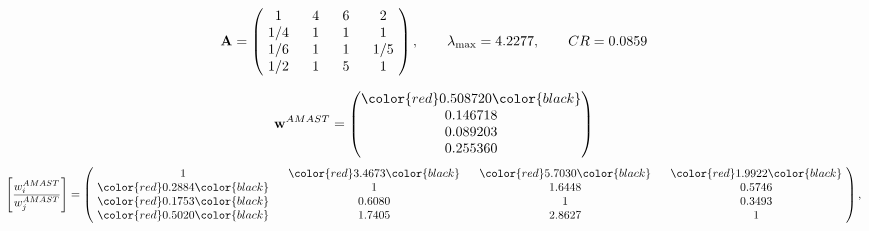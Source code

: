 \begin{example}
\begin{equation*}
\mathbf{A} =
\begin{pmatrix}
$\,\,$ 1 $\,\,$ & $\,\,$4$\,\,$ & $\,\,$6$\,\,$ & $\,\,$2 $\,\,$ \\
$\,\,$ 1/4$\,\,$ & $\,\,$ 1 $\,\,$ & $\,\,$1$\,\,$ & $\,\,$1 $\,\,$ \\
$\,\,$ 1/6$\,\,$ & $\,\,$ 1 $\,\,$ & $\,\,$ 1 $\,\,$ & $\,\,$ 1/5 $\,\,$ \\
$\,\,$ 1/2$\,\,$ & $\,\,$ 1 $\,\,$ & $\,\,$5$\,\,$ & $\,\,$ 1  $\,\,$ \\
\end{pmatrix},
\qquad
\lambda_{\max} =
4.2277,
\qquad
CR = 0.0859
\end{equation*}

\begin{equation*}
\mathbf{w}^{AMAST} =
\begin{pmatrix}
\color{red} 0.508720\color{black} \\
0.146718\\
0.089203\\
0.255360
\end{pmatrix}\end{equation*}
\begin{equation*}
\left[ \frac{{w}^{AMAST}_i}{{w}^{AMAST}_j} \right] =
\begin{pmatrix}
$\,\,$ 1 $\,\,$ & $\,\,$\color{red} 3.4673\color{black} $\,\,$ & $\,\,$\color{red} 5.7030\color{black} $\,\,$ & $\,\,$\color{red} 1.9922\color{black} $\,\,$ \\
$\,\,$\color{red} 0.2884\color{black} $\,\,$ & $\,\,$ 1 $\,\,$ & $\,\,$1.6448$\,\,$ & $\,\,$0.5746  $\,\,$ \\
$\,\,$\color{red} 0.1753\color{black} $\,\,$ & $\,\,$0.6080$\,\,$ & $\,\,$ 1 $\,\,$ & $\,\,$0.3493 $\,\,$ \\
$\,\,$\color{red} 0.5020\color{black} $\,\,$ & $\,\,$1.7405$\,\,$ & $\,\,$2.8627$\,\,$ & $\,\,$ 1  $\,\,$ \\
\end{pmatrix},
\end{equation*}


\end{example}
